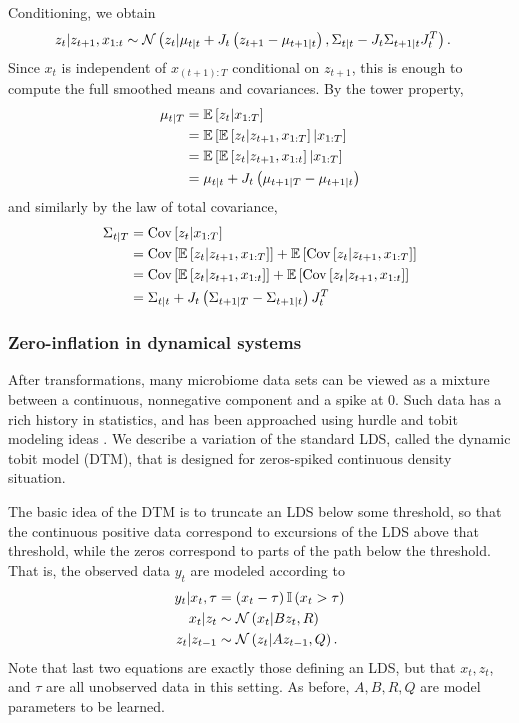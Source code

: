 \documentclass[14pt]{extreport}
\begin{document}
Conditioning, we obtain
\begin{align*}
  z_{t} \vert z_{t + 1}, x_{1:t} &\sim \mathcal{N}\left(
  z_{t} \vert \mu_{t \vert t} + J_{t}\left(z_{t + 1} - \mu_{t + 1 \vert t}\right),
  \Sigma_{t \vert t} - J_{t} \Sigma_{t + 1 \vert t} J_{t}^{T}
  \right).
\end{align*}
Since $x_{t}$ is independent of $x_{(t + 1): T}$ conditional on $z_{t + 1}$,
this is enough to compute the full smoothed means and covariances. By the tower
property,
\begin{align*}
  \mu_{t \vert T} &= \mathbb{E}\left[{z_{t} \vert x_{1:T}}\right] \\
  &= \mathbb{E}\left[{\mathbb{E}\left[{z_{t} \vert z_{t + 1}, x_{1 : T}}\right] \vert x_{1:T}}\right] \\
  &= \mathbb{E}\left[{\mathbb{E}\left[{z_{t} \vert z_{t + 1}, x_{1:t}}\right] \vert x_{1:T}}\right] \\
  &= \mu_{t \vert t} + J_{t}\left(\mu_{t + 1 \vert T} - \mu_{t + 1 \vert t}\right)
\end{align*}
and similarly by the law of total covariance,
\begin{align*}
  \Sigma_{t\vert T} &= \mathrm{Cov}\left[{z_{t} \vert x_{1:T}}\right] \\
  &= \mathrm{Cov}\left[{\mathbb{E}\left[{z_{t} \vert z_{t + 1}, x_{1:T}}\right]}\right] + \mathbb{E}\left[{\mathrm{Cov}\left[{z_{t} \vert z_{t + 1}, x_{1:T}}\right]}\right] \\
  &= \mathrm{Cov}\left[{\mathbb{E}\left[{z_{t} \vert z_{t + 1}, x_{1:t}}\right]}\right] + \mathbb{E}\left[{\mathrm{Cov}\left[{z_{t} \vert z_{t + 1}, x_{1:t}}\right]}\right] \\
  &= \Sigma_{t \vert t} + J_{t}\left(\Sigma_{t + 1 \vert T} - \Sigma_{t + 1 \vert t}\right) J_{t}^{T}
\end{align*}

\subsubsection{Zero-inflation in dynamical systems}
\label{subsubsec:zero_inflation_dynamical}

After transformations, many microbiome data sets can be viewed as a mixture
between a continuous, nonnegative component and a spike at 0. Such data has a
rich history in statistics, and has been approached using hurdle and tobit
modeling ideas \citep{min2002modeling}. We describe a variation of the standard
LDS, called the dynamic tobit model (DTM), that is designed for zeros-spiked
continuous density situation.

The basic idea of the DTM is to truncate an LDS below some threshold, so that
the continuous positive data correspond to excursions of the LDS above that
threshold, while the zeros correspond to parts of the path below the threshold.
That is, the observed data $y_t$ are modeled according to
\begin{align*}
  y_{t} \vert x_t, \tau &= \left(x_t - \tau\right)\mathbb{I}\left({x_t > \tau}\right)  \\
  x_t \vert z_t &\sim \mathcal{N}\left(x_t \vert B z_{t}, R\right) \\
  z_t \vert z_{t - 1} &\sim \mathcal{N}\left(z_t \vert A z_{t - 1}, Q\right).
\end{align*}
Note that last two equations are exactly those defining an LDS, but that $x_t,
z_t$, and $\tau$ are all unobserved data in this setting. As before, $A, B, R,
Q$ are model parameters to be learned.
\end{document}
